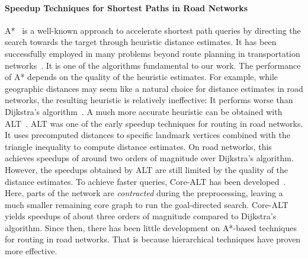 \documentclass[manuscript,review]{acmart}
\begin{document}
\paragraph{Speedup Techniques for Shortest Paths in Road Networks}
A*~\cite{hnr-afbhd-68} is a well-known approach to accelerate shortest path queries by directing the search towards the target through heuristic distance estimates.
It has been successfully employed in many problems beyond route planning in transportation networks~\cite{DBLP:conf/socs/StrasserHB14,DBLP:conf/ijcai/BonoGHS19,DBLP:conf/ijcai/0002UJAKK18}.
It is one of the algorithms fundamental to our work.
The performance of A* depends on the quality of the heuristic estimates.
For example, while geographic distances may seem like a natural choice for distance estimates in road networks, the resulting heuristic is relatively ineffective: It performs worse than Dijkstra's algorithm~\cite{gh-cspas-05}.
A much more accurate heuristic can be obtained with ALT~\cite{gh-cspas-05,gw-cppsp-05}.
ALT was one of the early speedup techniques for routing in road networks.
It uses precomputed distances to specific landmark vertices combined with the triangle inequality to compute distance estimates.
On road networks, this achieves speedups of around two orders of magnitude over Dijkstra's algorithm.
However, the speedups obtained by ALT are still limited by the quality of the distance estimates.
To achieve faster queries, Core-ALT has been developed~\cite{bdsssw-chgds-10}.
Here, parts of the network are \emph{contracted} during the preprocessing, leaving a much smaller remaining core graph to run the goal-directed search.
Core-ALT yields speedups of about three orders of magnitude compared to Dijkstra's algorithm.
Since then, there has been little development on A*-based techniques for routing in road networks.
That is because hierarchical techniques have proven more effective.
\end{document}
